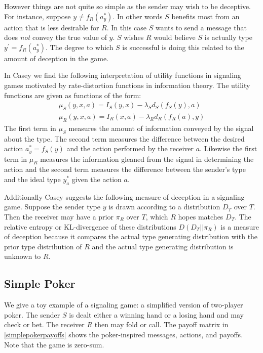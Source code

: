 \documentclass{article}
\begin{document}
However things are not quite so simple as the sender may wish to be deceptive. For instance, suppose $y \ne f_R(a_y^*)$. In other words $S$ benefits most from an action that is less desirable for $R$. In this case $S$ wants to send a message that does \emph{not} convey the true value of $y$. $S$ wishes $R$ would believe $S$ is actually type $y^\prime = f_R(a_y^*)$. The degree to which $S$ is successful is doing this related to the amount of deception in the game.

In Casey\cite{casey1} we find the following interpretation of utility functions in signaling games motivated by rate-distortion functions in information theory.  The utility functions are given as functions of the form:
\begin{align*}
    \mu_S(y, x, a) = I_S(y, x) - \lambda_S d_S(f_S(y), a)\\
    \mu_R(y, x, a) = I_R(x, a) - \lambda_R d_R(f_R(a), y)
\end{align*}
\noindent The first term in $\mu_S$ measures the amount of information conveyed by the signal about the type. The second term measures the difference between the desired action $a_y^* = f_S(y)$ and the action performed by the receiver $a$. Likewise the first term in $\mu_R$ measures the information gleaned from the signal in determining the action and the second term measures the difference between the sender's type and the ideal type $y_a^*$ given the action $a$.

Additionally Casey suggests the following measure of deception in a signaling game. Suppose the sender type $y$ is drawn according to a distribution $D_T$ over $T$. Then the receiver may have a prior $\pi_R$ over $T$, which $R$ hopes matches $D_T$. The relative entropy or KL-divergence of these distributions $D(D_T\vert\vert\pi_R)$ is a measure of deception because it compares the actual type generating distribution with the prior type distribution of $R$ and the actual type generating distribution is unknown to $R$. 

\subsection{Simple Poker}
\label{ssec:SimplePoker}

We give a toy example of a signaling game: a simplified version of two-player poker. The sender $S$ is dealt either a winning hand or a losing hand and may check or bet. The receiver $R$ then may fold or call. The payoff matrix in \autoref{simplepokerpayoffs} shows the poker-inspired messages, actions, and payoffs. Note that the game is zero-sum.
\end{document}
